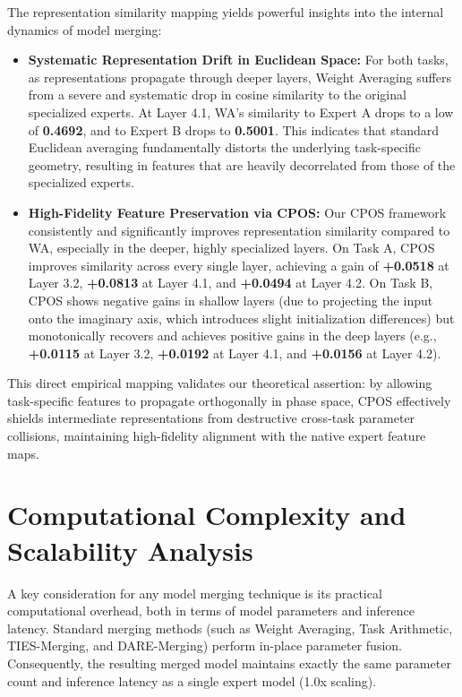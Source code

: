 \documentclass{article}
\theoremstyle{plain}
\theoremstyle{definition}
\theoremstyle{remark}
\begin{document}
The representation similarity mapping yields powerful insights into the internal dynamics of model merging:
\begin{itemize}
\item \textbf{Systematic Representation Drift in Euclidean Space:} For both tasks, as representations propagate through deeper layers, Weight Averaging suffers from a severe and systematic drop in cosine similarity to the original specialized experts. At Layer 4.1, WA's similarity to Expert A drops to a low of \textbf{0.4692}, and to Expert B drops to \textbf{0.5001}. This indicates that standard Euclidean averaging fundamentally distorts the underlying task-specific geometry, resulting in features that are heavily decorrelated from those of the specialized experts.
\item \textbf{High-Fidelity Feature Preservation via CPOS:} Our CPOS framework consistently and significantly improves representation similarity compared to WA, especially in the deeper, highly specialized layers. On Task A, CPOS improves similarity across every single layer, achieving a gain of \textbf{+0.0518} at Layer 3.2, \textbf{+0.0813} at Layer 4.1, and \textbf{+0.0494} at Layer 4.2. On Task B, CPOS shows negative gains in shallow layers (due to projecting the input onto the imaginary axis, which introduces slight initialization differences) but monotonically recovers and achieves positive gains in the deep layers (e.g., \textbf{+0.0115} at Layer 3.2, \textbf{+0.0192} at Layer 4.1, and \textbf{+0.0156} at Layer 4.2).
\end{itemize}
This direct empirical mapping validates our theoretical assertion: by allowing task-specific features to propagate orthogonally in phase space, CPOS effectively shields intermediate representations from destructive cross-task parameter collisions, maintaining high-fidelity alignment with the native expert feature maps.

\section{Computational Complexity and Scalability Analysis}
\label{sec:appendix_complexity}
A key consideration for any model merging technique is its practical computational overhead, both in terms of model parameters and inference latency. Standard merging methods (such as Weight Averaging, Task Arithmetic, TIES-Merging, and DARE-Merging) perform in-place parameter fusion. Consequently, the resulting merged model maintains exactly the same parameter count and inference latency as a single expert model (1.0x scaling).
\end{document}
